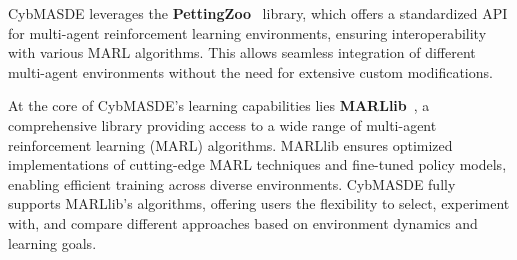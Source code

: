 \documentclass[pdflatex,sn-mathphys-num]{sn-jnl}%
\theoremstyle{thmstyleone}%
\theoremstyle{thmstyletwo}%
\theoremstyle{thmstylethree}%
\begin{document}
CybMASDE leverages the \textbf{PettingZoo}~\cite{Terry2021} library, which offers a standardized API for multi-agent reinforcement learning environments, ensuring interoperability with various MARL algorithms. This allows seamless integration of different multi-agent environments without the need for extensive custom modifications.

At the core of CybMASDE's learning capabilities lies \textbf{MARLlib}~\cite{hu2022marllib}, a comprehensive library providing access to a wide range of multi-agent reinforcement learning (MARL) algorithms. MARLlib ensures optimized implementations of cutting-edge MARL techniques and fine-tuned policy models, enabling efficient training across diverse environments. CybMASDE fully supports MARLlib's algorithms, offering users the flexibility to select, experiment with, and compare different approaches based on environment dynamics and learning goals.
\end{document}
